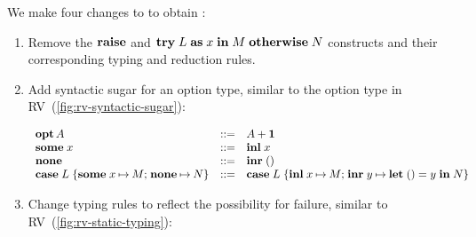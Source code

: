 \documentclass[acmsmall,review,anonymous]{acmart}
\begin{document}
We make four changes to \affineEGV to obtain \affineAGV:
\begin{enumerate}
\item
  Remove the $ \relax{\mathbf{raise}}$ and $ \relax{\mathbf{try}}\;\relax{L}\;\relax{\mathbf{as}}\;\relax{x}\; \relax{\mathbf{in}}\;\relax{M}\;\relax{\mathbf{otherwise}}\;\relax{N}$ constructs and their corresponding typing and reduction rules.
\item
  Add syntactic sugar for an option type, similar to the option type in RV~(\cref{fig:rv-syntactic-sugar}):
  \\
  \begin{minipage}{1.0\linewidth}
    \[%
      \begin{array}{lcl}%
        \gvTyOpt{A} &::=& \gvTySum{A}{\gvTyUnit}
        \\
        \gvSome{x} &::=& \gvInl{x}
        \\
        \gvNone &::=& \gvInr{\gvUnit}
        \\
        \gvCaseOpt{L}{x}{M}{N} &::=& \gvCaseSum{L}{x}{M}{y}{\gvLetUnit{y}{N}}
      \end{array}
    \]
  \end{minipage}
\item
  Change typing rules to reflect the possibility for failure, similar to RV~(\cref{fig:rv-static-typing}):
  \begin{center}
    \begin{prooftree*}
    \end{prooftree*}%
    \begin{prooftree*}
    \end{prooftree*}
  \end{center} 
  \begin{center}
    \begin{prooftree*}
    \end{prooftree*}%
    \begin{prooftree*}

\end{prooftree*}
\end{center}
\end{enumerate}
\end{document}
